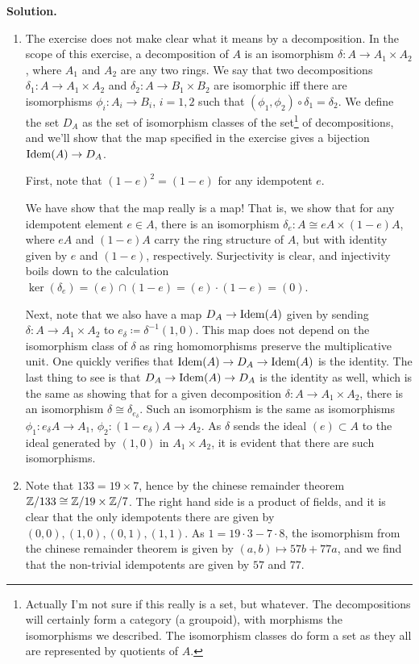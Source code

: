 \documentclass[a4paper,11pt]{article}
\begin{document}
\textbf{Solution.}
\begin{enumerate}
    \item The exercise does not make clear what it means by a decomposition. In
        the scope of this exercise, a decomposition of $A$ is an
        isomorphism $\delta : A \to A_1 \times A_2$, where 
        $A_1$ and $A_2$ are any two rings. We say that two decompositions
        $\delta_1: A \to A_1 \times A_2$ and $\delta_2: A \to B_1 \times B_2$
        are isomorphic iff there are isomorphisms
        $\phi_i : A_i \to B_i$, $i = 1,2$ such that $(\phi_1, \phi_2) \circ
        \delta_1 = \delta_2$. We define the set $D_A$ as the set of isomorphism
        classes of the set\footnote{Actually I'm not sure if this really is a
        set, but whatever.  The decompositions will certainly form a category
        (a groupoid), with morphisms the isomorphisms we described. The
        isomorphism classes do form a set as they all are represented by quotients
        of $A$.} of decompositions, and we'll show that the map specified in the
        exercise gives a bijection $\operatorname{Idem}(A) \to D_A$. 

        First, note that $(1-e)^2 = (1-e)$ for any idempotent $e$. 

        We have show that the map really is a map! That is, we show
        that for any idempotent element $e \in A$, there is an isomorphism
        $\delta_e: A \cong eA \times (1-e)A$, where $eA$ and $(1-e)A$ carry the
        ring structure of $A$, but with identity given by $e$ and $(1-e)$,
        respectively. Surjectivity is clear, and injectivity boils down to the 
        calculation $\ker(\delta_e) = (e) \cap (1-e) = (e)\cdot(1-e) = (0)$. 

        Next, note that we also have a map $D_A \to \operatorname{Idem}(A)$ given by sending
        $\delta: A \to A_1 \times A_2$ to $e_\delta \coloneqq \delta^{-1}(1,0)$. 
        This map does not depend on the isomorphism class of $\delta$ as ring
        homomorphisms preserve the multiplicative unit. One quickly verifies that
        $\operatorname{Idem}(A) \to D_A \to \operatorname{Idem}(A)$ is the identity. The last thing to see 
        is that $D_A \to \operatorname{Idem}(A) \to D_A$ is the identity as well, which is the 
        same as showing that for a given decomposition $\delta: A \to A_1
        \times A_2$, there is an isomorphism $\delta \cong \delta_{e_\delta}$. 
        Such an isomorphism is the same as isomorphisms $\phi_1 : e_\delta A
        \to A_1$, $\phi_2: (1-e_\delta)A \to A_2$. As $\delta$ sends the ideal
        $(e) \subset A$ to the ideal generated by $(1,0)$ in $A_1 \times A_2$,
        it is evident that there are such isomorphisms. 
    \item Note that $133 = 19 \times 7$, hence by the chinese remainder theorem
        $\mathbb{Z}/133 \cong \mathbb{Z}/19 \times \mathbb{Z}/7$. The right hand side is a product of 
        fields, and it is clear that the only idempotents there are given by 
        $(0,0), (1,0), (0,1), (1,1)$. As $1= 19 \cdot 3 - 7 \cdot 8$, 
        the isomorphism from the chinese remainder theorem is given by 
        $(a,b) \mapsto 57b + 77a$, and we find that the non-trivial idempotents
        are given by $57$ and $77$. 
\end{enumerate}
\end{document}
